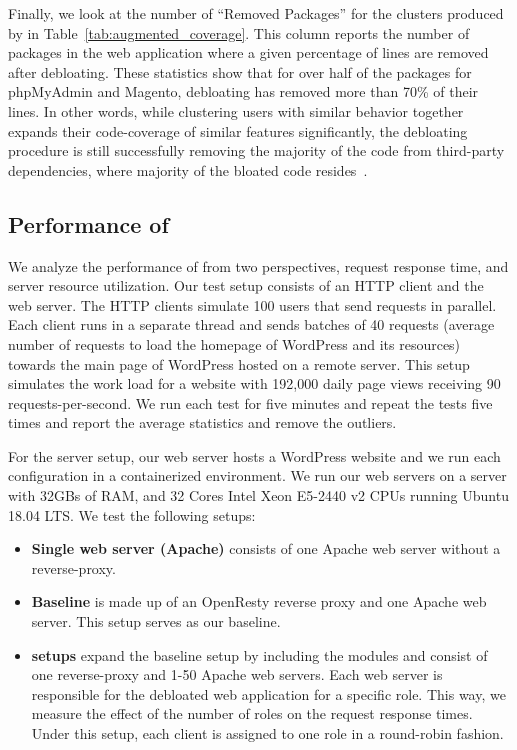 Finally, we look at the number of ``Removed Packages'' for the clusters produced by \dbltr{} in Table~\ref{tab:augmented_coverage}. 
This column reports the number of packages in the web application where a given percentage of lines are removed after debloating.
These statistics show that for over half of the packages for phpMyAdmin and Magento, debloating has removed more than 70\% of their lines. 
In other words, while clustering users with similar behavior together expands their code-coverage of similar features significantly, the debloating procedure is still successfully removing the majority of the code from third-party dependencies, where majority of the bloated code resides~\cite{lessismore}.

\subsection{Performance of \dbltr}

We analyze the performance of \dbltr{} from two perspectives, request response time, and server resource utilization. 
Our test setup consists of an HTTP client and the web server. 
The HTTP clients simulate 100 users that send requests in parallel. 
Each client runs in a separate thread and sends batches of 40 requests (average number of requests to load the homepage of WordPress and its resources) towards the main page of WordPress hosted on a remote server. 
This setup simulates the work load for a website with 192,000 daily page views receiving 90 requests-per-second. 
We run each test for five minutes and repeat the tests five times and report the average statistics and remove the outliers. 

For the server setup, our web server hosts a WordPress website and we run each configuration in a containerized environment. 
We run our web servers on a server with 32GBs of RAM, and 32 Cores Intel Xeon E5-2440 v2 CPUs running Ubuntu 18.04 LTS. 
We test the following setups:

\begin{itemize}
    \item \textbf{Single web server (Apache)} consists of one Apache web server without a reverse-proxy. 
    \item \textbf{Baseline} is made up of an OpenResty reverse proxy and one Apache web server. This setup serves as our baseline. 
    \item \textbf{\dbltr{} setups} expand the baseline setup by including the \dbltr{} modules and consist of one reverse-proxy and 1-50 Apache web servers. Each web server is responsible for the debloated web application for a specific role. This way, we measure the effect of the number of roles on the request response times. Under this setup, each client is assigned to one role in a round-robin fashion.
\end{itemize}

